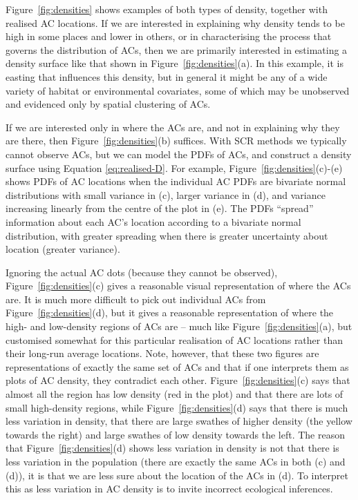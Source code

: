 \documentclass[useAMS,usenatbib,referee]{biom}
\begin{document}
Figure~\ref{fig:densities} shows examples of both types of density, together with realised AC locations. If we are interested in explaining why density tends to be high in some places and lower in others, or in characterising the process that governs the distribution of ACs, then we are primarily interested in estimating a density surface like that shown in Figure~\ref{fig:densities}(a). In this example, it is easting that influences this density, but in general it might be any of a wide variety of habitat or environmental covariates, some of which may be unobserved and evidenced only by spatial clustering of ACs. 

If we are interested only in where the ACs are, and not in explaining why they are there, then Figure~\ref{fig:densities}(b) suffices. With SCR methods we typically cannot observe ACs, but we can model the PDFs of ACs, and construct a density surface using Equation \eqref{eq:realised-D}. For example, Figure~\ref{fig:densities}(c)-(e) shows PDFs of AC locations when the individual AC PDFs are bivariate normal distributions with small variance in (c), larger variance in (d), and variance increasing linearly from the centre of the plot in (e). The PDFs ``spread'' information about each AC's location according to a bivariate normal distribution, with greater spreading when there is greater uncertainty about location (greater variance).

Ignoring the actual AC dots (because they cannot be observed), Figure~\ref{fig:densities}(c) gives a reasonable visual representation of where the ACs are. It is much more difficult to pick out individual ACs from Figure~\ref{fig:densities}(d), but it gives a reasonable representation of where the high- and low-density regions of ACs are -- much like Figure~\ref{fig:densities}(a), but customised somewhat for this particular realisation of AC locations rather than their long-run average locations. Note, however, that these two figures are representations of exactly the same set of ACs and that if one interprets them as plots of AC density, they contradict each other. Figure~\ref{fig:densities}(c) says that almost all the region has low density (red in the plot) and that there are lots of small high-density regions, while Figure~\ref{fig:densities}(d) says that there is much less variation in density, that there are large swathes of higher density (the yellow towards the right) and large swathes of low density towards the left. The reason that Figure~\ref{fig:densities}(d) shows less variation in density is not that there is less variation in the population (there are exactly the same ACs in both (c) and (d)), it is that we are less sure about the location of the ACs in (d). To interpret this as less variation in AC density is to invite incorrect ecological inferences.
\end{document}
